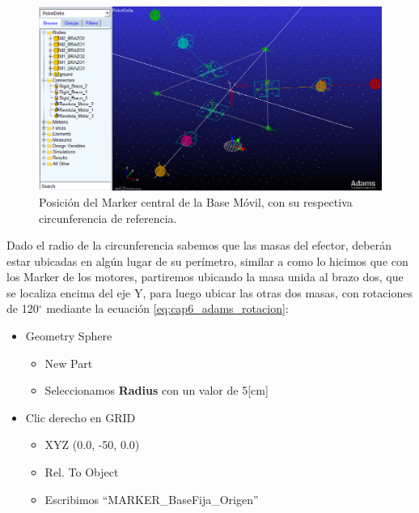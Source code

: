           \begin{figure}[h]
            \centering
            \includegraphics[width=1\linewidth]{Main/Chapter6/Images6/adams/base-movil/posicion_marker_efector.png}
            \caption{Posición del Marker central de la Base Móvil, con su respectiva circunferencia de referencia.}
            \label{f:Cap6_adams_baseMovil_posicion_marker_central}
        \end{figure}
        
        Dado el radio de la circunferencia sabemos que las masas del efector, deberán estar ubicadas en algún lugar de su perímetro, similar a como lo hicimos que con los Marker de los motores, partiremos ubicando la masa unida al brazo dos, que se localiza encima del eje Y, para luego ubicar las otras dos masas, con rotaciones de 120$^{\circ}$ mediante la ecuación \eqref{eq:cap6_adams_rotacion}:
        
        \begin{scope}
            \renewcommand{\labelitemi}{\blacklozenge}
            \renewcommand{\labelitemii}{\checkmark}
            \begin{itemize}
                \item Geometry Sphere
                \begin{itemize}
                    \item New Part
                    \item Seleccionamos \textbf{Radius} con un valor de 5[cm]
                \end{itemize}
                \item Clic derecho en GRID
                \begin{itemize}
                    \item XYZ (0.0, -50, 0.0)
                    \item Rel. To Object
                    \item Escribimos ``MARKER\_BaseFija\_Origen''
                \end{itemize}
            \end{itemize}
        \end{scope}
        
